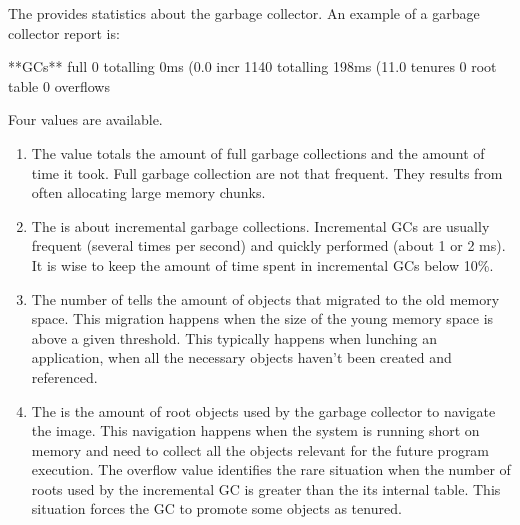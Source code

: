 \documentclass[a4paper,10pt,twoside]{book}
\begin{document}
The  provides statistics about the garbage collector. An example of a garbage collector report is:

\begin{code}
**GCs**
	full			0 totalling 0ms (0.0%
	incr		1140 totalling 198ms (11.0%
	tenures		0
	root table	0 overflows
\end{code}

Four values are available.

\begin{enumerate}
\item The  value totals the amount of full garbage collections and the amount of time it took. Full garbage collection are not that frequent. They results from often allocating large memory chunks.

\item The  is about incremental garbage collections. Incremental GCs are usually frequent (several times per second) and quickly performed (about 1 or 2 ms). It is wise to keep the amount of time spent in incremental GCs below 10\%. 


\item The number of  tells the amount of objects that migrated to the old memory space. This migration happens when the size of the young memory space is above a given threshold. This typically happens when lunching an application, when all the necessary objects haven't been created and referenced. 

\item The  is the amount of root objects used by the garbage collector to navigate the image. This navigation happens when the system is running short on memory and need to collect all the objects relevant for the future program execution. The overflow value identifies the rare situation when the number of roots used by the incremental GC is greater than the its internal table. This situation forces the GC to promote some objects as tenured.

\end{enumerate}
\end{document}
